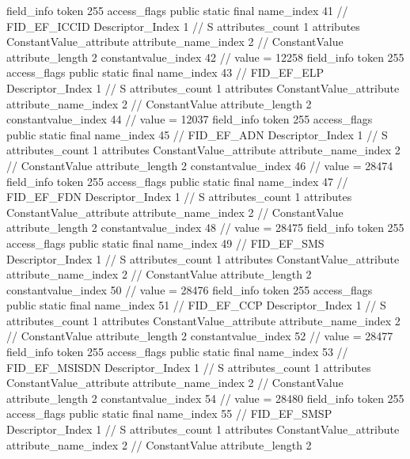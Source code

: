 {{{{{{				}
			}
			field_info {
				token	255
				access_flags	public static final
				name_index	41		// FID_EF_ICCID
				Descriptor_Index	1		// S
				attributes_count	1
				attributes {
				ConstantValue_attribute {
					attribute_name_index	2		// ConstantValue
					attribute_length	2
					constantvalue_index	42		// value = 12258
				}
				}
			}
			field_info {
				token	255
				access_flags	public static final
				name_index	43		// FID_EF_ELP
				Descriptor_Index	1		// S
				attributes_count	1
				attributes {
				ConstantValue_attribute {
					attribute_name_index	2		// ConstantValue
					attribute_length	2
					constantvalue_index	44		// value = 12037
				}
				}
			}
			field_info {
				token	255
				access_flags	public static final
				name_index	45		// FID_EF_ADN
				Descriptor_Index	1		// S
				attributes_count	1
				attributes {
				ConstantValue_attribute {
					attribute_name_index	2		// ConstantValue
					attribute_length	2
					constantvalue_index	46		// value = 28474
				}
				}
			}
			field_info {
				token	255
				access_flags	public static final
				name_index	47		// FID_EF_FDN
				Descriptor_Index	1		// S
				attributes_count	1
				attributes {
				ConstantValue_attribute {
					attribute_name_index	2		// ConstantValue
					attribute_length	2
					constantvalue_index	48		// value = 28475
				}
				}
			}
			field_info {
				token	255
				access_flags	public static final
				name_index	49		// FID_EF_SMS
				Descriptor_Index	1		// S
				attributes_count	1
				attributes {
				ConstantValue_attribute {
					attribute_name_index	2		// ConstantValue
					attribute_length	2
					constantvalue_index	50		// value = 28476
				}
				}
			}
			field_info {
				token	255
				access_flags	public static final
				name_index	51		// FID_EF_CCP
				Descriptor_Index	1		// S
				attributes_count	1
				attributes {
				ConstantValue_attribute {
					attribute_name_index	2		// ConstantValue
					attribute_length	2
					constantvalue_index	52		// value = 28477
				}
				}
			}
			field_info {
				token	255
				access_flags	public static final
				name_index	53		// FID_EF_MSISDN
				Descriptor_Index	1		// S
				attributes_count	1
				attributes {
				ConstantValue_attribute {
					attribute_name_index	2		// ConstantValue
					attribute_length	2
					constantvalue_index	54		// value = 28480
				}
				}
			}
			field_info {
				token	255
				access_flags	public static final
				name_index	55		// FID_EF_SMSP
				Descriptor_Index	1		// S
				attributes_count	1
				attributes {
				ConstantValue_attribute {
					attribute_name_index	2		// ConstantValue
					attribute_length	2
}}}}}}}

